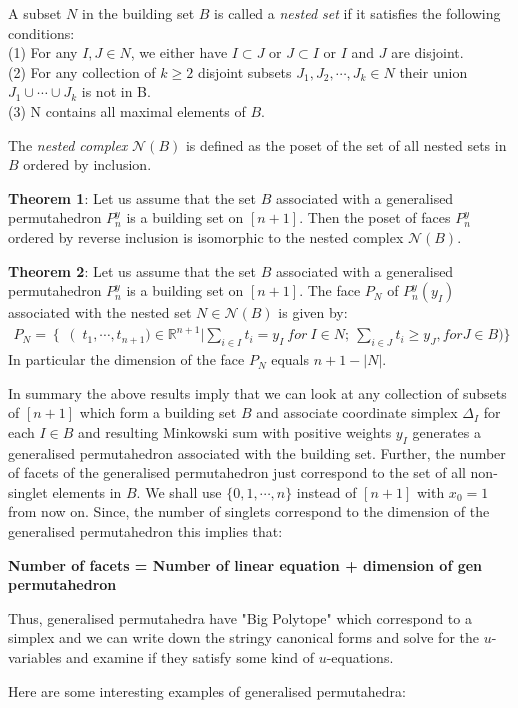 \documentclass[hidelinks,12pt]{article}
\newcommand{\bea}[1]{\begin{eqnarray}\label{#1} }
\newcommand{\eea}{\end{eqnarray}}
\def\bea{\begin{eqnarray}}
\def\eea{\end{eqnarray}}
\begin{document}
A subset $N$ in the building set $B$ is called a {\it nested set} if it satisfies the following conditions:\\
\noindent
(1) For any $I,J \in N$, we either have $I \subset J$ or $J\subset I$ or $I$ and $J$ are disjoint.\\
(2) For any collection of $k \geq 2$ disjoint subsets $J_1,J_2,\cdots, J_k \in N$ their union $J_1 \cup \cdots \cup J_k$ is not in B. \\
(3) N contains all maximal elements of $B$.

The {\it nested complex} $\mathcal{N}(B)$ is defined as the poset of the set of all nested sets in $B$ ordered by inclusion.

{\bf Theorem 1}: Let us assume that the set $B$ associated with a generalised permutahedron $P_n^{y}$ is a building set on $[n+1]$. Then the poset of faces $P_n^{y}$ ordered by reverse inclusion is isomorphic to the nested complex $\mathcal{N}(B)$. 

{\bf Theorem 2}: Let us assume that the set $B$ associated with a generalised permutahedron $P_n^{y}$ is a building set on $[n+1]$. The face $P_N$ of $P_n^{y}(y_I)$ associated with the nested set $N \in \mathcal{N}(B)$ is given by:
\bea
P_N = \left \{ \right (t_1,\cdots,t_{n+1}) \in \mathbb{R}^{n+1} | \sum_{i \in I} t_i =y_{I}~for~I \in N; ~ \sum_{i \in J}t_i \geq y_J, for J \in B  )\}
\eea
In particular the dimension of the face $P_N$ equals $n+1-|N|$. 

In summary the above results imply that we can look at any collection of subsets of $[n+1]$ which form a building set $B$ and associate  coordinate simplex $\Delta_I$ for each $I \in B$ and resulting Minkowski sum with positive weights $y_I$ generates a generalised permutahedron associated with the building set. Further, the number of facets of the generalised permutahedron just correspond to the set of all non-singlet elements in $B$.  
We shall use $ \{0,1,\cdots,n \}$ instead of $[n+1]$ with $x_0 =1$ from now on. Since, the number of singlets correspond to the dimension of the generalised permutahedron this implies that:

{\bf Number of facets = Number of linear equation + dimension of  gen permutahedron}
 
Thus, generalised permutahedra have "Big Polytope" which correspond to a simplex and we can write down the stringy canonical forms and solve for the $u$-variables and examine if they satisfy some kind of $u$-equations.

Here are some interesting examples of generalised permutahedra:
\end{document}
